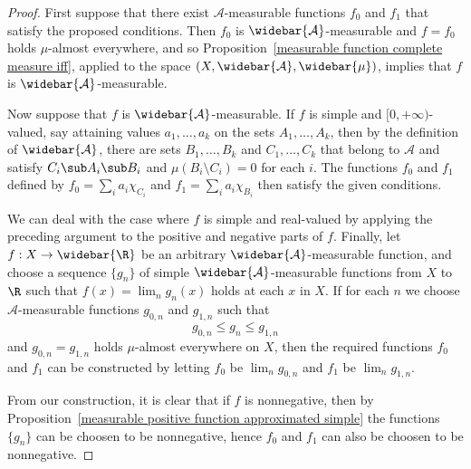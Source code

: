 \begin{proof}
First suppose that there exist $\mathcal{A}$-measurable functions $f_0$ and $f_1$ that satisfy the proposed conditions. Then $f_0$ is $\widebar{\mathcal{A}}$-measurable and $f=f_0$ holds $\mu$-almost everywhere, and so Proposition~\ref{measurable function complete measure iff}, applied to the space $(X,\widebar{\mathcal{A}},\widebar{\mu})$, implies that $f$ is $\widebar{\mathcal{A}}$-measurable.\par
Now suppose that $f$ is $\widebar{\mathcal{A}}$-measurable. If $f$ is simple and $[0,+\infty)$-valued, say attaining values $a_1,\dots,a_k$ on the sets $A_1,\dots,A_k$, then by the definition of $\widebar{\mathcal{A}}$, there are sets $B_1,\dots,B_k$ and $C_1,\dots,C_k$ that belong to $\mathcal{A}$ and satisfy $C_i\sub A_i\sub B_i$ and $\mu(B_i\setminus C_i)=0$ for each $i$. The functions $f_0$ and $f_1$ defined by $f_0=\sum_ia_i\chi_{C_i}$ and $f_1=\sum_ia_i\chi_{B_i}$ then satisfy the given conditions.\par
We can deal with the case where $f$ is simple and real-valued by applying the preceding argument to the positive and negative parts of $f$. Finally, let $f:X\to\widebar{\R}$ be an arbitrary $\widebar{\mathcal{A}}$-measurable function, and choose a sequence $\{g_n\}$ of simple $\widebar{\mathcal{A}}$-measurable functions from $X$ to $\R$ such that $f(x)=\lim_ng_n(x)$ holds at each $x$ in $X$. If for each $n$ we choose $\mathcal{A}$-measurable functions $g_{0,n}$ and $g_{1,n}$ such that
\[g_{0,n}\leq g_n\leq g_{1,n}\]
and $g_{0,n}=g_{1,n}$ holds $\mu$-almost everywhere on $X$, then the required functions $f_0$ and $f_1$ can be constructed by letting $f_0$ be $\lim_ng_{0,n}$ and $f_1$ be $\lim_ng_{1,n}$.\par
From our construction, it is clear that if $f$ is nonnegative, then by Proposition~\ref{measurable positive function approximated simple} the functions $\{g_n\}$ can be choosen to be nonnegative, hence $f_0$ and $f_1$ can also be choosen to be nonnegative.
\end{proof}
